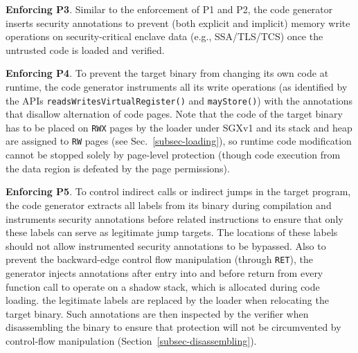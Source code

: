 
\vspace{3pt}\noindent\textbf{Enforcing P3}. Similar to the enforcement of P1 and P2, the code generator inserts security annotations to prevent (both explicit and implicit) memory write operations on security-critical enclave data (e.g., SSA/TLS/TCS) once the untrusted code is loaded and verified. 

\vspace{3pt}\noindent\textbf{Enforcing P4}. To prevent the target binary from changing its own code at runtime, the code generator instruments all its write operations (as identified by the APIs \verb|readsWritesVirtualRegister()| and \verb|mayStore()|) with the annotations that disallow alternation of code pages. Note that the code of the target binary has to be placed on \texttt{RWX} pages by the loader under SGXv1 and its stack and heap are assigned to \texttt{RW} pages (see Sec.~\ref{subsec-loading}), so runtime code modification cannot be stopped solely by page-level protection (though code execution from the data region is defeated by the page permissions). 


\vspace{3pt}\noindent\textbf{Enforcing P5}. To control indirect calls or indirect jumps in the target program, the code generator extracts all labels from its binary during compilation and instruments security annotations before related instructions to ensure that only these labels can serve as legitimate jump targets. The locations of these labels should not allow \DIFdelbegin {}\DIFdelend instrumented security annotations to be bypassed. 
Also to prevent the backward-edge control flow manipulation (through \texttt{RET}), the generator injects annotations after entry into and before return from every function call to operate on a shadow stack, which is allocated during code loading. \DIFdelbegin {}\DIFdelend \DIFaddbegin {}\DIFaddend the legitimate labels are \DIFaddbegin {}\DIFaddend replaced by the loader when relocating the target binary. Such annotations are then inspected by the verifier when disassembling the binary to ensure that protection will not be circumvented by control-flow manipulation (Section~\ref{subsec-disassembling}).  



